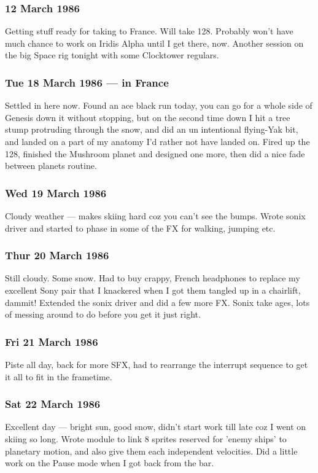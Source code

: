 \subsubsection{12 March 1986}
Getting stuff ready for taking to France. Will take 128. Probably won't have much chance to work on Iridis Alpha until I get there, now. Another session on the big Space rig tonight with some Clocktower regulars.

\subsubsection{Tue 18 March 1986 — in France}
Settled in here now. Found an ace black run today, you can go for a whole side of Genesis down it without stopping, but on the second time down I hit a tree stump protruding through the snow, and did an un intentional flying-Yak bit, and landed on a part of my anatomy I'd rather not have landed on. Fired up the 128, finished the Mushroom planet and designed one more, then did a nice fade between planets routine.

\subsubsection{Wed 19 March 1986}
Cloudy weather — makes skiing hard coz you can't see the bumps. Wrote sonix driver and started to phase in some of the FX for walking, jumping etc.

\subsubsection{Thur 20 March 1986}
Still cloudy. Some snow. Had to buy crappy, French headphones to replace my excellent Sony pair that I knackered when I got them tangled up in a chairlift, dammit! Extended the sonix driver and did a few more FX. Sonix take ages, lots of messing around to do before you get it just right.

\subsubsection{Fri 21 March 1986}
Piste all day, back for more SFX, had to rearrange the interrupt sequence to get it all to fit in the frametime.

\subsubsection{Sat 22 March 1986}
Excellent day — bright sun, good snow, didn't start work till late coz I went on skiing so long. Wrote module to link 8 sprites reserved for 'enemy ships' to planetary motion, and also give them each independent velocities. Did a little work on the Pause mode when I got back from the bar.

